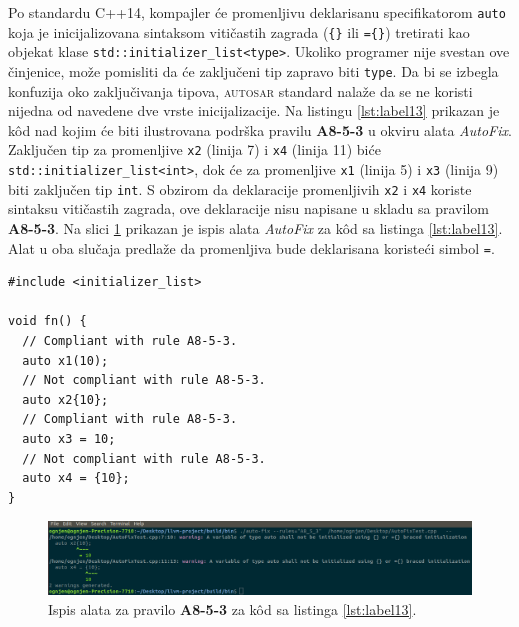 \documentclass[12pt,oneside]{memoir}
\begin{document}
Po standardu C++14, kompajler \'{c}e  promenljivu deklarisanu specifikatorom \texttt{auto} koja je inicijalizovana sintaksom viti\v{c}astih zagrada (\texttt{\{\}} ili \texttt{=\{\}}) tretirati kao objekat klase
\texttt{std::initializer\_list<type>}. Ukoliko programer nije svestan ove \v{c}injenice, mo\v{z}e pomisliti da \'{c}e zaklju\v{c}eni tip zapravo biti \texttt{type}. Da bi se izbegla konfuzija oko zaklju\v{c}ivanja
tipova, \textsc{autosar} standard nala\v{z}e da se ne koristi nijedna od navedene dve vrste inicijalizacije.
Na listingu \ref{lst:label13} prikazan je k\^{o}d nad kojim \'{c}e biti ilustrovana podr\v{s}ka pravilu \textbf{A8-5-3} u okviru alata \textit{AutoFix}. 
Zaklju\v{c}en tip za promenljive \texttt{x2} (linija 7) i \texttt{x4} (linija 11) bi\'c{e} \texttt{std::initializer\_list<int>}, dok \'{c}e za promenljive \texttt{x1} (linija 5) i \texttt{x3} (linija 9) biti zaklju\v{c}en tip \texttt{int}. S obzirom da deklaracije promenljivih \texttt{x2} i \texttt{x4} koriste sintaksu
viti\v{c}astih zagrada, ove deklaracije nisu napisane u skladu sa pravilom \textbf{A8-5-3}.
Na slici \ref{fig:A8-5-3} prikazan je ispis alata \textit{AutoFix} za k\^{o}d sa listinga \ref{lst:label13}. Alat u oba slu\v{c}aja predla\v{z}e
da promenljiva bude deklarisana koriste\'{c}i simbol \texttt{=}.

\begin{lstlisting}[style=customc, caption={K\^{o}d nad kojim je demonstrirana podr\v{s}ka pravilu \textbf{A8-5-3} u okviru alata \textit{AutoFix}. Ispis alata \textit{AutoFix} nakon pokretanja nad ovim kodom prikazan je na slici \ref{fig:A8-5-3}.}, label=lst:label13]
#include <initializer_list>

void fn() {
  // Compliant with rule A8-5-3.
  auto x1(10);
  // Not compliant with rule A8-5-3.
  auto x2{10};
  // Compliant with rule A8-5-3.
  auto x3 = 10;
  // Not compliant with rule A8-5-3.
  auto x4 = {10};
}

\end{lstlisting}

\begin{figure}[!h]
\begin{center}
\includegraphics[scale=0.3]{A8_5_3.png}
\end{center}
\caption{Ispis alata za pravilo \textbf{A8-5-3} za k\^{o}d sa listinga \ref{lst:label13}.}
\label{fig:A8-5-3}
\end{figure}
\end{document}
